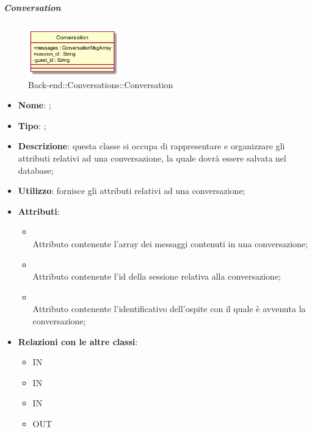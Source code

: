 \hypertarget{Conversation_label}{\subparagraph{Conversation}}
\begin{figure}[h]
	\centering
	\includegraphics[width=0.35\textwidth,height=\textheight,keepaspectratio]{images/ClassConversation.png}
	\caption{Back-end::Conversations::Conversation}
\end{figure}
\begin{itemize}
	\item \textbf{Nome}: ;
	\item \textbf{Tipo}: ;
	\item \textbf{Descrizione}: questa classe si occupa di rappresentare e organizzare gli attributi relativi ad una conversazione, la quale dovrà essere salvata nel database;
	\item \textbf{Utilizzo}: fornisce gli attributi relativi ad una conversazione;
	\item \textbf{Attributi}:
	\begin{itemize}
		\item[]  \\
		Attributo contenente l'array dei messaggi contenuti in una conversazione;
		\item[]  \\
		Attributo contenente l'id della sessione relativa alla conversazione;
		\item[]  \\
		Attributo contenente l'identificativo dell'ospite con il quale è avvenuta la conversazione;
	\end{itemize}
	\item \textbf{Relazioni con le altre classi}:
	\begin{itemize}
		\item IN \hyperlink{<<interface>> ConversationsDAO_label}{}
		\item IN \hyperlink{ConversationObserver_label}{}
		\item IN \hyperlink{ConversationsDAODynamoDB_label}{}
		\item OUT \hyperlink{ConversationMsg_label}{}
	\end{itemize}
\end{itemize}
\FloatBarrier


